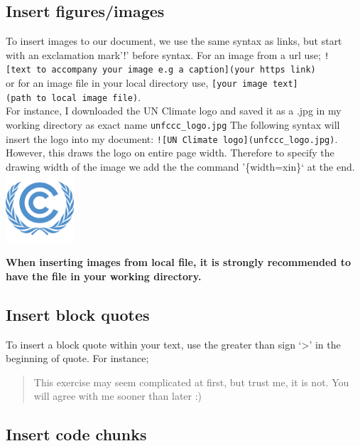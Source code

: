 \documentclass[
]{book}
\begin{document}
\hypertarget{insert-figuresimages}{%
\subsection{Insert figures/images}\label{insert-figuresimages}}

To insert images to our document, we use the same syntax as links, but start with an exclamation mark'!' before syntax.
For an image from a url use; \texttt{!{[}text\ to\ accompany\ your\ image\ e.g\ a\ caption{]}(your\ https\ link)}\\
or for an image file in your local directory use, \texttt{{[}your\ image\ text{]}(path\ to\ local\ image\ file)}.\\
For instance, I downloaded the UN Climate logo and saved it as a .jpg in my working directory as exact name \texttt{unfccc\_logo.jpg}
The following syntax will insert the logo into my document:
\texttt{!{[}UN\ Climate\ logo{]}(unfccc\_logo.jpg)}. However, this draws the logo on entire page width. Therefore to specify the drawing width of the image we add the the command '\{width=xin\}` at the end. \includegraphics[width=1in,height=\textheight]{unfccc_logo.jpg}

\textbf{When inserting images from local file, it is strongly recommended to have the file in your working directory.}

\hypertarget{insert-block-quotes}{%
\subsection{Insert block quotes}\label{insert-block-quotes}}

To insert a block quote within your text, use the greater than sign `\textgreater{}' in the beginning of quote. For instance;

\begin{quote}
This exercise may seem complicated at first,
but trust me, it is not. You will agree with me sooner than later :)
\end{quote}

\hypertarget{insert-code-chunks}{%
\subsection{Insert code chunks}\label{insert-code-chunks}}
\end{document}
